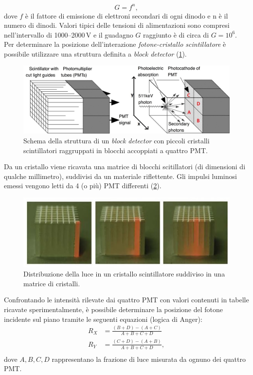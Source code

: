 \begin{equation}
	G = f^n,
\end{equation}
dove $f$ è il fattore di emissione di elettroni secondari di ogni dinodo e n è il numero di dinodi. Valori tipici delle tensioni di alimentazioni sono  compresi nell'intervallo di \numrange[range-phrase=--]{1000}{2000}\,\unit{\volt} e il guadagno $G$ raggiunto è di circa di $G=10^6$. Per determinare la posizione dell'interazione \textit{fotone-cristallo scintillatore} è possibile utilizzare una struttura definita a \textit{block detector} (\Fig\ref{fig:block_detector}).
\begin{figure}[t]
	\centering
	\includegraphics[width=0.8\linewidth]{./ImageFiles/block_detector.jpg}
	\caption{Schema della struttura di un \textit{block detector} con piccoli cristalli scintillatori raggruppati in blocchi accoppiati a quattro PMT\cite{Schmitz2013ThePO}.} 
	\label{fig:block_detector}
\end{figure}
Da un cristallo viene ricavata una matrice di blocchi scitillatori (di dimensioni di qualche millimetro), suddivisi da un materiale riflettente. Gli impulsi luminosi emessi vengono letti da 4 (o più) PMT differenti (\Fig\ref{fig:block_detector_cube}).
\begin{figure}[b]
	\centering
	\includegraphics[width=0.6\linewidth]{./ImageFiles/block_detector_lightoncube.jpg}
	\caption{Distribuzione della luce in un cristallo scintillatore suddiviso in una matrice di cristalli\cite{Jones2017}.} 
	\label{fig:block_detector_cube}
\end{figure}
Confrontando le intensità rilevate dai quattro PMT con valori contenuti in tabelle ricavate sperimentalmente, è possibile determinare la posizione del fotone incidente sul piano tramite le seguenti equazioni \cite{Bailey2014} (logica di Anger):
\begin{equation}
	\begin{split}
		R_X&=\frac{(B+D)-(A+C)}{A+B+C+D} \\
		R_Y&=\frac{(C+D)-(A+B)}{A+B+C+D}, \\
	\end{split}
\end{equation}
dove $A,B,C,D$ rappresentano la frazione di luce misurata da ognuno dei quattro PMT.


